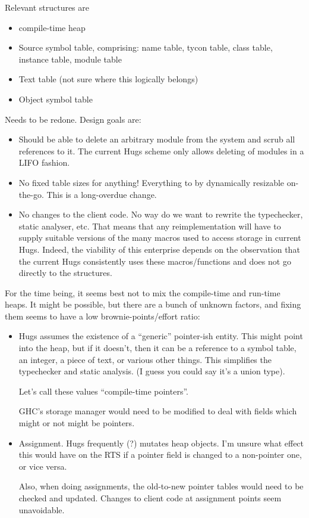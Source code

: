 Relevant structures are
\begin{itemize}
\item compile-time heap
\item Source symbol table, comprising: name table, tycon table,
class table, instance table, module table
\item Text table (not sure where this logically belongs)
\item Object symbol table
\end{itemize}
Needs to be redone.  Design goals are:
\begin{itemize}
\item Should be able to delete an arbitrary module from the system
      and scrub all references to it.  The current Hugs scheme only
      allows deleting of modules in a LIFO fashion.
\item No fixed table sizes for anything!
      Everything to by dynamically resizable on-the-go.
      This is a long-overdue change.
\item No changes to the client code.  No way do we want to rewrite
      the typechecker, static analyser, etc.  That means that
      any reimplementation will have to supply suitable versions
      of the many macros used to access storage in current Hugs.
      Indeed, the viability of this enterprise depends on
      the observation that the current Hugs consistently uses these 
      macros/functions and does not go directly to the structures.
\end{itemize}

For the time being, it seems best not to mix the compile-time
and run-time heaps.  It might be possible, but there are a bunch
of unknown factors, and fixing them seems to have a low 
brownie-points/effort ratio:
\begin{itemize}
\item Hugs assumes the existence of a ``generic'' pointer-ish entity.
      This might point into the heap, but if it doesn't, then it can
      be a reference to a symbol table, an integer, a piece of text,
      or various other things.  This simplifies the typechecker and
      static analysis.  (I guess you could say it's a union type).

      Let's call these values ``compile-time pointers''.

      GHC's storage manager would need to be modified to
      deal with fields which might or not might be pointers.

\item Assignment.  Hugs frequently (?) mutates heap objects.  I'm
      unsure what effect this would have on the RTS if a pointer field
      is changed to a non-pointer one, or vice versa.

      Also, when doing assignments, the old-to-new pointer tables
      would need to be checked and updated.  Changes to
      client code at assignment points seem unavoidable.
\end{itemize}
